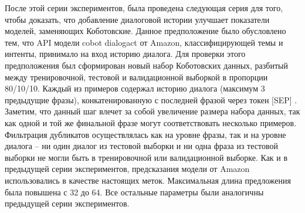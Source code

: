 После этой серии экспериментов, была проведена следующая серия для того, чтобы доказать, что добавление диалоговой истории улучшает показатели моделей, заменяющих Коботовские. Данное предположение было обусловлено тем, что API модели cobot dialogact от Amazon, классифицирующей темы и интенты, принимало на вход историю диалога. 
Для проверки этого предположения был сформирован новый набор Коботовских данных, разбитый между тренировочной, тестовой и валидационной выборкой в пропорции 80/10/10. Каждый из примеров содержал историю диалога (максимум 3 предыдущие фразы), конкатенированную с последней фразой через токен [SEP] . Заметим, что данный шаг влечет за собой увеличение размера набора данных, так как одной и той же финальной фразе могут соответствовать несколько примеров. Фильтрация дубликатов осуществлялась как на уровне фразы, так и на уровне диалога -- ни один диалог из тестовой выборки и ни одна фраза из тестовой выборки не могли быть в тренировочной или валидационной выборке. Как и в предыдущей серии экспериментов, предсказания модели от Amazon использовались в качестве настоящих меток. Максимальная длина предложения была повышена с 32 до 64. Все остальные параметры были аналогичны предыдущей серии экспериментов.


\begin{table}[htbp]
\centering
\caption {Точность (взвешенный-F1) с диалоговой историей для многозадачной модели с 1 линейным слоем, только Коботовские задачи}
\label{mtldream:2}
\end{table}


